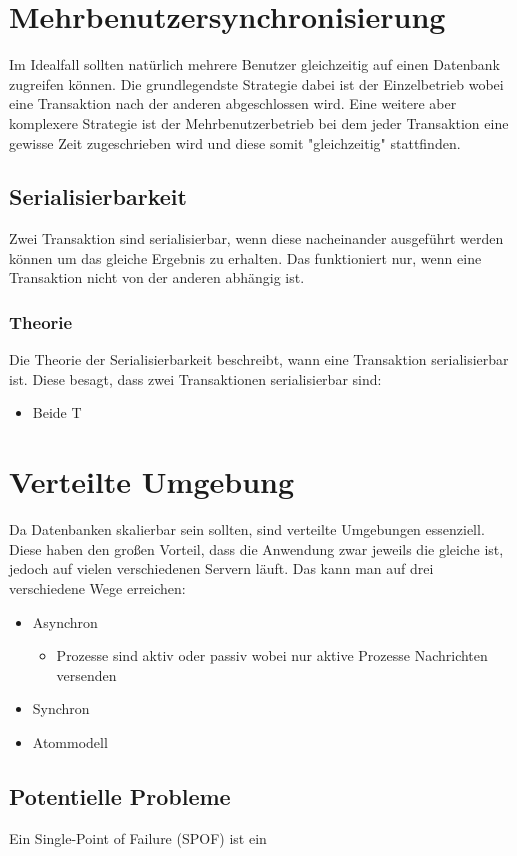 \documentclass{article}
\begin{document}
	\section{Mehrbenutzersynchronisierung}
	Im Idealfall sollten natürlich mehrere Benutzer gleichzeitig auf einen Datenbank zugreifen können. Die grundlegendste Strategie dabei ist der Einzelbetrieb wobei eine Transaktion nach der anderen abgeschlossen wird. Eine weitere aber komplexere Strategie ist der Mehrbenutzerbetrieb bei dem jeder Transaktion eine gewisse Zeit zugeschrieben wird und diese somit "gleichzeitig" stattfinden.
	\subsection{Serialisierbarkeit}
	Zwei Transaktion sind serialisierbar, wenn diese nacheinander ausgeführt werden können um das gleiche Ergebnis zu erhalten. Das funktioniert nur, wenn eine Transaktion nicht von der anderen abhängig ist.
	\subsubsection{Theorie}
	Die Theorie der Serialisierbarkeit beschreibt, wann eine Transaktion serialisierbar ist. Diese besagt, dass zwei Transaktionen serialisierbar sind:
	\begin{itemize}
		\item{Beide T}
	\end{itemize}
	\section{Verteilte Umgebung}
	Da Datenbanken skalierbar sein sollten, sind verteilte Umgebungen essenziell. Diese haben den großen Vorteil, dass die Anwendung zwar jeweils die gleiche ist, jedoch auf vielen verschiedenen Servern läuft. Das kann man auf drei verschiedene Wege erreichen:
	\begin{itemize}
		\item{Asynchron}
		\begin{itemize}
			\item{Prozesse sind aktiv oder passiv wobei nur aktive Prozesse Nachrichten versenden}
		\end{itemize}
		\item{Synchron}
		\item{Atommodell}
	\end{itemize}
	\subsection{Potentielle Probleme}
	Ein Single-Point of Failure (SPOF) ist ein

	 













	
\end{document}
